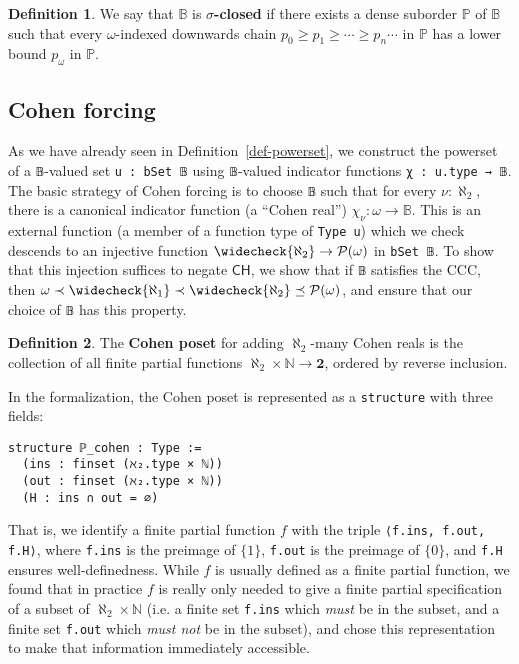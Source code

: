 \documentclass[sigplan,10pt,review, autoref,anonymous]{acmart}
\newcommand{\B}{\mathbb{B}}
\newcommand{\lil}{\lstinline}
\newcommand{\CH}{\mathsf{CH}}
\theoremstyle{definition}
\newtheorem{defn}{Definition}[section]
\begin{document}
\begin{defn}\label{def-sigma-closed}
We say that \(\B\) is \textbf{\(\sigma\)-closed} if there exists a dense suborder \(\mathbb{P}\) of \(\B\) such that every \(\omega\)-indexed downwards chain \(p_0 \geq p_1 \geq \cdots \geq p_n \cdots\) in \(\mathbb{P}\) has a lower bound \(p_{\omega}\) in \(\mathbb{P}\).
\end{defn}

\subsection{Cohen forcing}

As we have already seen in Definition~\autoref{def-powerset}, we construct the powerset of a \lil{𝔹}-valued set \lstinline{u : bSet 𝔹} using \lil{𝔹}-valued indicator functions \lil{χ : u.type → 𝔹}. The basic strategy of Cohen forcing is to choose \lil{𝔹} such that for every \(\nu : \aleph_2\), there is a canonical indicator function (a ``Cohen real'') \(\chi_{\nu} : \omega \to \mathbb{B}\). This is an external function (a member of a function type of \lstinline{Type u}) which we check descends to an injective function \(\widecheck{\aleph_2} \to \mathcal{P}(\omega)\) in \lil{bSet 𝔹}. To show that this injection suffices to negate \(\CH\), we show that if \lil{𝔹} satisfies the CCC, then \(\omega \prec \widecheck{\aleph_1} \prec \widecheck{\aleph_2} \preceq \mathcal{P}(\omega)\), and ensure that our choice of \lil{𝔹} has this property.

\begin{defn}
  The \textbf{Cohen poset} for adding $\aleph_2$-many Cohen reals is the collection of all finite partial functions $\aleph_2 \times \mathbb{N} \to \mathbf{2}$, ordered by reverse inclusion.
\end{defn}

In the formalization, the Cohen poset is represented as a \lstinline{structure} with three fields:
\begin{lstlisting}
structure ℙ_cohen : Type :=
  (ins : finset (ℵ₂.type × ℕ))
  (out : finset (ℵ₂.type × ℕ))
  (H : ins ∩ out = ∅)
\end{lstlisting}

That is, we identify a finite partial function $f$ with the triple \lil{⟨f.ins, f.out, f.H⟩}, where \lil{f.ins} is the preimage of $\{1\}$, \lil{f.out} is the preimage of $\{0\}$, and \lil{f.H} ensures well-definedness. While $f$ is usually defined as a finite partial function, we found that in practice $f$ is really only needed to give a finite partial specification of a subset of $\aleph_2 \times \mathbb{N}$ (i.e. a finite set \lil{f.ins} which \emph{must} be in the subset, and a finite set \lil{f.out} which \emph{must not} be in the subset), and chose this representation to make that information immediately accessible.
\end{document}
